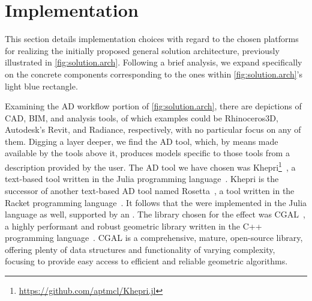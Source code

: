 \section{Implementation}%
\label{sec:solution.impl}

This section details implementation choices with regard to the chosen platforms
for realizing the initially proposed general solution architecture, previously
illustrated in \cref{fig:solution.arch}. Following a brief analysis, we expand
specifically on the concrete components corresponding to the ones within
\cref{fig:solution.arch}'s light blue rectangle.

Examining the \ac{AD} workflow portion of \cref{fig:solution.arch}, there are
depictions of \ac{CAD}, \ac{BIM}, and analysis tools, of which examples could be
Rhinoceros3D, Autodesk's Revit, and Radiance, respectively, with no particular
focus on any of them.  Digging a layer deeper, we find the \ac{AD} tool, which,
by means made available by the tools above it, produces models specific to those
tools from a description provided by the user.  The \ac{AD} tool we have chosen
was
Khepri\footnote{\url{https://github.com/aptmcl/Khepri.jl}}~\cite{Leitao:2019:GRUGEAV},
a text-based tool written in the Julia programming
language~\cite{Bezanson:2017:JAFANC}.  Khepri is the successor of another
text-based \ac{AD} tool named Rosetta~\cite{Leitao:2011:PGDCAD}, a tool written
in the Racket programming language~\cite{PLT:2010:Reference}.  It follows that
the \primitives{} were implemented in the Julia language as well, supported by
an \geomlibrary{}.  The library chosen for the effect was
\ac{CGAL}~\cite{CGAL:5.3:Project}, a highly performant and robust geometric
library written in the C++ programming language~\cite{Stroustrup:2013:CPP}.
\Ac{CGAL} is a comprehensive, mature, open-source library, offering plenty of
data structures and functionality of varying complexity, focusing to provide
easy access to efficient and reliable geometric algorithms.

